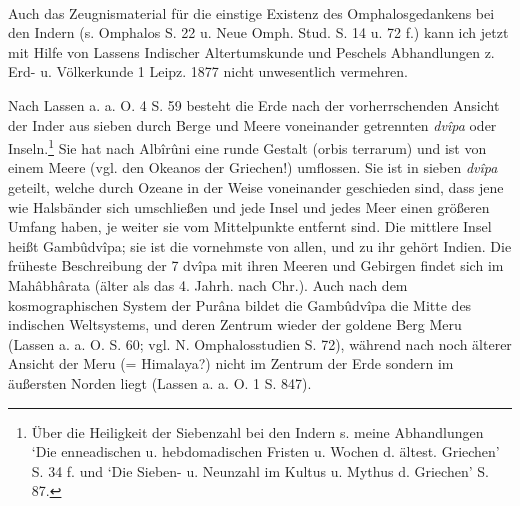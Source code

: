 \documentclass[a4paper, 11pt, oneside]{article}
\begin{document}
\paragraph{}
Auch das Zeugnismaterial für die einstige Existenz des Omphalosgedankens bei den Indern (s. Omphalos S. 22 u. Neue Omph. Stud. S. 14 u. 72 f.) kann ich jetzt mit Hilfe von Lassens Indischer Altertumskunde und Peschels Abhandlungen z. Erd- u. Völkerkunde 1 Leipz. 1877 nicht unwesentlich vermehren.

Nach Lassen a. a. O. 4 S. 59 besteht die Erde nach der vorherrschenden Ansicht der Inder aus sieben durch Berge und Meere voneinander getrennten \emph{dvîpa} oder Inseln.\footnote{Über die Heiligkeit der Siebenzahl bei den Indern s. meine Abhandlungen `Die enneadischen u. hebdomadischen Fristen u. Wochen d. ältest. Griechen' S. 34 f. und `Die Sieben- u. Neunzahl im Kultus u. Mythus d. Griechen' S. 87.} Sie hat nach Albîrûni eine runde Gestalt (orbis terrarum) und ist von einem Meere (vgl. den Okeanos der Griechen!) umflossen. Sie ist in sieben \emph{dvîpa} geteilt, welche durch Ozeane in der Weise voneinander geschieden sind, dass jene wie Halsbänder sich umschließen und jede Insel und jedes Meer einen größeren Umfang haben, je weiter sie vom Mittelpunkte entfernt sind. Die mittlere Insel heißt Gambûdvîpa; sie ist die vornehmste von allen, und zu ihr gehört Indien. Die früheste Beschreibung der 7 dvîpa mit ihren Meeren und Gebirgen findet sich im Mahâbhârata (älter als das 4. Jahrh. nach Chr.). Auch nach dem kosmographischen System der Purâna bildet die Gambûdvîpa die Mitte des indischen Weltsystems, und deren Zentrum wieder der goldene Berg Meru (Lassen a. a. O. S. 60; vgl. N. Omphalosstudien S. 72), während nach noch älterer Ansicht der Meru (= Himalaya?) nicht im Zentrum der Erde sondern im äußersten Norden liegt (Lassen a. a. O. 1 S. 847).
\end{document}
